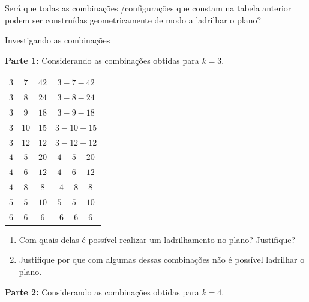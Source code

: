 Será que todas as  combinações /configurações que constam na tabela anterior podem ser construídas geometricamente de modo a ladrilhar o plano?


 \label{at_ladsemi}

\begin{task} {Investigando as combinações}

\textbf{Parte 1:} Considerando as  combinações obtidas para $k=3$.
 
\setlength\tabcolsep{5mm}
\begin{tabu} to \textwidth{|c|c|c|c|}
\hline
{} &  &  &   \\
\hline
$3$ & $7$ & $42$ & $3-7-42$ \\
\hline
$3$ & $8$ & $24$ &  $3-8-24$ \\
\hline
$3$ & $9$ & $18$ &  $3-9-18$ \\
\hline
$3$ & $10$ & $15$ &  $ 3-10-15$ \\
\hline
$3$ & $12$ & $12$ &  $3-12-12$ \\
\hline
$4$ & $5$ & $20$ &  $4-5-20$ \\
\hline
$4$ & $6$ & $12$ &  $4-6-12$ \\
\hline
$4$ & $8$ & $8$ &  $4-8-8$ \\
\hline
$5$ & $5$ & $10$ &  $5-5-10$ \\
\hline
$6$ & $6$ & $6$ &  $6-6-6$ \\
\hline

\end{tabu}

\begin{enumerate}

\item	Com quais delas é possível realizar um ladrilhamento no plano? Justifique?
\item	Justifique por que com algumas dessas combinações não é possível ladrilhar o plano.

\end{enumerate}


\textbf{Parte 2:} Considerando as  combinações obtidas para $k=4$. 
\setlength\tabcolsep{5mm}
\begin{tabu} to \textwidth{|c|c|c|c|c|}
\hline
{} &  &  & &   \\
\hline


\end{tabu}
\end{task}
